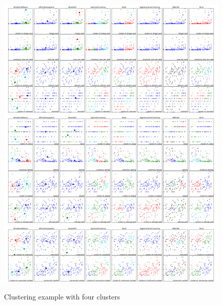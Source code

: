 \documentclass{article}
\begin{document}
\begin{figure}[h]
\centering 
\includegraphics[width=0.97\columnwidth]{clustering_4_1.pdf}
\includegraphics[width=0.97\columnwidth]{clustering_4_2.pdf}
\includegraphics[width=0.97\columnwidth]{clustering_4_3.pdf}
\caption{Clustering example with four clusters}
\label{fig:clustering}
\end{figure}
\end{document}
